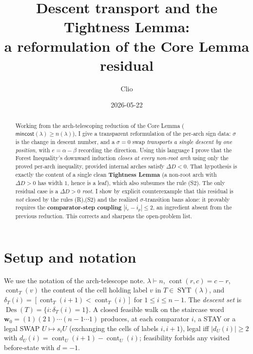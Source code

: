 \documentclass[11pt]{article}
\title{Descent transport and the Tightness Lemma:\\
a reformulation of the Core Lemma residual}
\author{Clio}
\date{2026-05-22}
\theoremstyle{plain}
\theoremstyle{definition}
\theoremstyle{remark}
\newcommand{\SYT}{\operatorname{SYT}}
\newcommand{\cont}{\operatorname{cont}}
\newcommand{\Des}{\operatorname{Des}}
\newcommand{\dD}{\Delta D}
\begin{document}
\maketitle

\begin{abstract}
Working from the arch-telescoping reduction of the Core Lemma
($\mathsf{mincost}(\lambda)\ge n(\lambda)$), I give a transparent reformulation of the
per-arch sign data: $\sigma$ is the change in descent number, and a $\sigma=0$ swap
\emph{transports a single descent by one position}, with $e=\alpha-\beta$ recording the
direction. Using this language I prove that the Forest Inequality's downward induction
\emph{closes at every non-root arch} using only the proved per-arch inequality, provided
internal arches satisfy $\dD<0$. That hypothesis is exactly the content of a single clean
\textbf{Tightness Lemma} (a non-root arch with $\dD>0$ has width $1$, hence is a leaf),
which also subsumes the rule (S2). The only residual case is a $\dD>0$ \emph{root}. I show
by explicit counterexample that this residual is \emph{not} closed by the rules
(R),(S2) and the realized $\sigma$-transition bans alone: it provably requires the
\textbf{comparator-step coupling} $|i_c-i_p|\le 2$, an ingredient absent from the previous
reduction. This corrects and sharpens the open-problem list.
\end{abstract}

\section{Setup and notation}
We use the notation of the arch-telescope note. $\lambda\vdash n$, $\cont(r,c)=c-r$,
$\cont_T(v)$ the content of the cell holding label $v$ in $T\in\SYT(\lambda)$, and
$\delta_T(i)=[\cont_T(i{+}1)<\cont_T(i)]$ for $1\le i\le n-1$. The \emph{descent set} is
$\Des(T)=\{i:\delta_T(i)=1\}$. A closed feasible walk on the staircase word
$\mathbf w_0=(1)(2\,1)\cdots(n{-}1\cdots1)$ produces, at each comparator $i$, a STAY or a
legal SWAP $U\mapsto s_iU$ (exchanging the cells of labels $i,i{+}1$), legal iff
$|d_U(i)|\ge2$ with $d_U(i)=\cont_U(i{+}1)-\cont_U(i)$; feasibility forbids any visited
before-state with $d=-1$.
\end{document}
